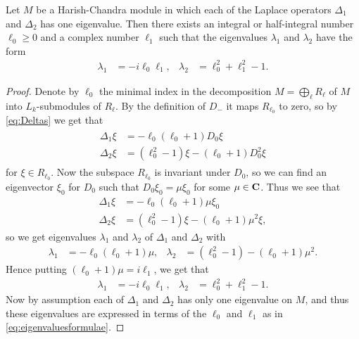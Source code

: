 \begin{proposition}\label{prop:indecomposabledecomposition}
  Let $M$ be a Harish-Chandra module in which each of the Laplace operators $\Delta_1$ and $\Delta_2$ has one eigenvalue. Then there exists an integral or half-integral number $\ell_0\geq 0$ and a complex number $\ell_1$ such that the eigenvalues $\lambda_1$ and $\lambda_2$ have the form
  \begin{align}\label{eq:eigenvaluesformulae}
    \lambda_1 &= -i\ell_0\ell_1, & \lambda_2 &= \ell_0^2 + \ell_1^2 - 1.
  \end{align}
\end{proposition}
\begin{proof}
  Denote by $\ell_0$ the minimal index in the decomposition $M=\bigoplus_\ell R_\ell$ of $M$ into $L_k$-submodules of $R_\ell$. By the definition of $D_-$ it maps $R_{\ell_0}$ to zero, so by \cref{eq:Deltas} we get that
  \begin{align}\label{eq:Deltastemp}
    \begin{aligned}
      \Delta_1 \xi &= -\ell_0(\ell_0+1)D_0\xi \\
      \Delta_2 \xi &= (\ell_0^2-1)\xi - (\ell_0+1)D_0^2\xi
    \end{aligned}
  \end{align}
  for $\xi\in R_{\ell_0}$. Now the subspace $R_{\ell_0}$ is invariant under $D_0$, so we can find an eigenvector $\xi_0$ for $D_0$ such that $D_0\xi_0 = \mu\xi_0$ for some $\mu\in\mathbf{C}$. Thus we see that
  \begin{align*}
    \Delta_1 \xi &= -\ell_0(\ell_0+1)\mu\xi_0 \\
    \Delta_2 \xi &= (\ell_0^2-1)\xi - (\ell_0+1)\mu^2\xi,
  \end{align*}
  so we get eigenvalues $\lambda_1$ and $\lambda_2$ of $\Delta_1$ and $\Delta_2$ with
  \begin{align*}
    \lambda_1 &= -\ell_0(\ell_0+1)\mu, & \lambda_2 &= (\ell_0^2-1) - (\ell_0+1)\mu^2.
  \end{align*}
  Hence putting $(\ell_0+1)\mu = i\ell_1$, we get that
  \begin{align*}
    \lambda_1 &= -i\ell_0\ell_1, & \lambda_2 &= \ell_0^2 + \ell_1^2 - 1.
  \end{align*}
  Now by assumption each of $\Delta_1$ and $\Delta_2$ has only one eigenvalue on $M$, and thus these eigenvalues are expressed in terms of the $\ell_0$ and $\ell_1$ as in \cref{eq:eigenvaluesformulae}. 
\end{proof}

